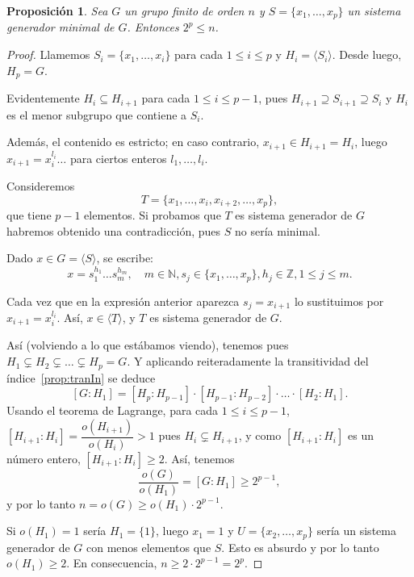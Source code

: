 \documentclass[12pt]{article}
\newtheorem{proposition}[theorem]{Proposición}
\begin{document}
\begin{proposition}
Sea $G$ un grupo finito de orden $n$ y $S = \lbrace x_1, \ldots, x_p \rbrace$ un sistema generador minimal de $G$. Entonces $2^p \leq n$.
\end{proposition}
\begin{proof}Llamemos $S_i = \lbrace x_1, \ldots, x_i \rbrace$ para cada $1 \leq i \leq p$ y $H_i = \langle S_i \rangle$. Desde luego, $H_p = G$.

Evidentemente $H_i \subseteq H_{i+1}$ para cada $1 \leq i \leq p-1$, pues $H_{i+1} \supseteq S_{i+1} \supseteq S_i$ y $H_i$ es el menor subgrupo que contiene a $S_i$.

Además, el contenido es estricto; en caso contrario, $x_{i+1} \in H_{i+1} = H_i$, luego $x_{i+1} = x_i^{l_i} \ldots$ para ciertos enteros $l_1, \ldots, l_i$.

Consideremos $$T = \lbrace x_1, \ldots, x_i, x_{i+2}, \ldots, x_p \rbrace,$$ que tiene $p-1$ elementos. Si probamos que $T$ es sistema generador de $G$ habremos obtenido una contradicción, pues $S$ no sería minimal.

Dado $x \in G = \langle S \rangle$, se escribe: $$x = s_1^{h_1}\ldots s_m^{h_m}, \quad m \in \mathbb{N}, s_j \in \lbrace x_1, \ldots, x_p \rbrace, h_j \in \mathbb{Z}, 1 \leq j \leq m.$$

Cada vez que en la expresión anterior aparezca $s_j = x_{i+1}$ lo sustituimos por $x_{i+1} = x_i^{l_i}$. Así, $x \in \langle T \rangle$, y $T$ es sistema generador de $G$. 

Así (volviendo a lo que estábamos viendo), tenemos pues $H_1 \subsetneq H_2 \subsetneq \ldots \subsetneq H_p = G.$ Y aplicando reiteradamente la transitividad del índice~\ref{prop:tranIn} se deduce $$[G:H_1] = [H_p:H_{p-1}] \cdot [H_{p-1}:H_{p-2}] \cdot \ldots \cdot [H_2:H_1].$$ Usando el teorema de Lagrange, para cada $1 \leq i \leq p-1$, $[H_{i+1}:H_i] = \dfrac{o(H_{i+1})}{o(H_i)} >1$ pues $H_i \subsetneq H_{i+1}$, y como $[H_{i+1}:H_i]$ es un número entero, $[H_{i+1}:H_i] \geq 2$. Así, tenemos $$\dfrac{o(G)}{o(H_1)} = [G:H_1] \geq 2^{p-1},$$ y por lo tanto $n = o(G) \geq o(H_1) \cdot 2^{p-1}.$

Si $o(H_1) = 1$ sería $H_1 = \lbrace 1 \rbrace$, luego $x_1 = 1$ y $U = \lbrace x_2, \ldots, x_p \rbrace$ sería un sistema generador de $G$ con menos elementos que $S$. Esto es absurdo y por lo tanto $o(H_1) \geq 2$. En consecuencia, $n \geq 2 \cdot 2^{p-1} = 2^p$.

\end{proof}
\end{document}
